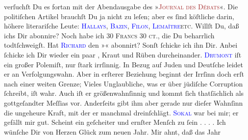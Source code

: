\documentclass[twoside=false,titlepage=false,open=any, parskip=never, fontsize=12pt, headings=small, chapterprefix=false, appendixprefix=false]{scrbook}
\newcommand{\dotsfour}{%
.\kern\ellipsisgap 
.\kern\ellipsisgap
.\kern\ellipsisgap
.\kern\ellipsisgap 
\relax}
\newcommand{\pbposition}{\depth}
\newcommand{\pb}{\nobreak\hspace{0pt}\raisebox{-0.1em}{\raisebox{\pbposition}{\textnormal{|}}}\nobreak\hspace{0pt}}
\begin{document}
               verſuchſt Du es fortan mit der Abendausgabe des »\textsc{\textcolor{brown}{Journal des Débats}{}\ledrightnote{\textcolor{brown}{Journal des débats}}}«. Die politiſchen Artikel
               brauchſt Du ja nicht zu leſen; aber es ſind köſtliche \textsc{\label{K_mets_Goldmann_94-partII-666v}\label{K_mets_Goldmann_94-partII-666h}} darin, höhere literariſche Leute: \textsc{\textcolor{blue}{Hallays}{}\ledrightnote{\textcolor{blue}{André Hallays}}, \textcolor{blue}{Bazin}{}\ledrightnote{\textcolor{blue}{René Bazin}}, \textcolor{blue}{Filon}{}\ledrightnote{\textcolor{blue}{Augustin Filon}}, \textcolor{blue}{Lemaître}{}\ledrightnote{\textcolor{blue}{Jules Lemaître}}{ }}\textsc{etc}. Willſt Du, daß ichs Dir abonnire? Noch habe ich \textsc{30 Francs 30 ct.}, die Du beharrlich todtſchweigſt. Hat \textsc{\textcolor{blue}{Richard}{}\ledrightnote{\textcolor{blue}{Richard Beer-Hofmann}}} den »\label{K_L02630-66v}\label{K_L02630-66h}« abonnirt? Sonſt
               ſchicke ich ihn Dir. Anbei ſchicke ich Dir wieder ein paar \label{K_mets_Goldmann_94-partII-55v}\label{K_mets_Goldmann_94-partII-55h}, Kraut und Rüben durcheinander. \textsc{\textcolor{blue}{Drumont}{}\ledrightnote{\textcolor{blue}{Édouard Drumont}}} iſt ein großer {\pb}Polemiſt, nur ſtark irrſinnig. In Bezug auf Juden
               und Deutſche leidet er an Verfolgungswahn. Aber in erſterer Beziehung beginnt der
               Irrſinn doch erſt nach einer weiten Grenze; Vieles Unglaubliche, was er über jüdiſche
               Corruption ſchreibt, iſt wahr. Auch iſt er größenwahnſinnig und kommt ſich
               thatſächlich als gottgeſandter Meſſias vor. Anderſeits gibt ihm aber gerade nur
               dieſer Wahnſinn die ungeheure Kraft, mit der er manchmal dreinſchlägt.\pend
           \pstart
           {\pb}\textsc{\textcolor{blue}{Sokal}{}\ledrightnote{\textcolor{blue}{Clemens Sokal}}} war bei mir; er
               gefällt mir gut. Scheint ein geſcheiter und ernſter Menſch zu ſein{\dotsfour}\pend
           \pstart
           Ich wünſche Dir von Herzen Glück zum neuen Jahr. Mir ahnt, daß das Jahr
\end{document}
